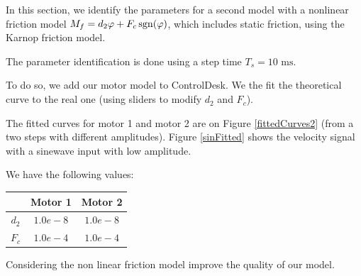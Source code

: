 In this section, we identify the parameters for a second model with a nonlinear friction model $M_f = d_2 \varphi + F_c \mathop{\rm sgn}\nolimits(\varphi)$, which includes static friction, using the Karnop friction model.

The parameter identification is done using a step time $T_s = 10 \text{ ms}$.

To do so, we add our motor model to ControlDesk. We the fit the theoretical curve to the real one (using sliders to modify $d_2$ and $F_c$).

The fitted curves for motor 1 and motor 2 are on Figure \ref{fittedCurves2} (from a two steps with different amplitudes). Figure \ref{sinFitted} shows the velocity signal with a sinewave input with low amplitude.

We have the following values:


\begin{center}
\begin{tabular}{|c|c|c|}
 \hline
 & Motor 1 & Motor 2 \\
 \hline 
 $d_2$ & $1.0e-8$ & $1.0e-8$ \\ 
 \hline 
 $F_c$ & $1.0e-4$ & $1.0e-4$  \\
 \hline
\end{tabular}
\end{center}


Considering the non linear friction model improve the quality of our model.

